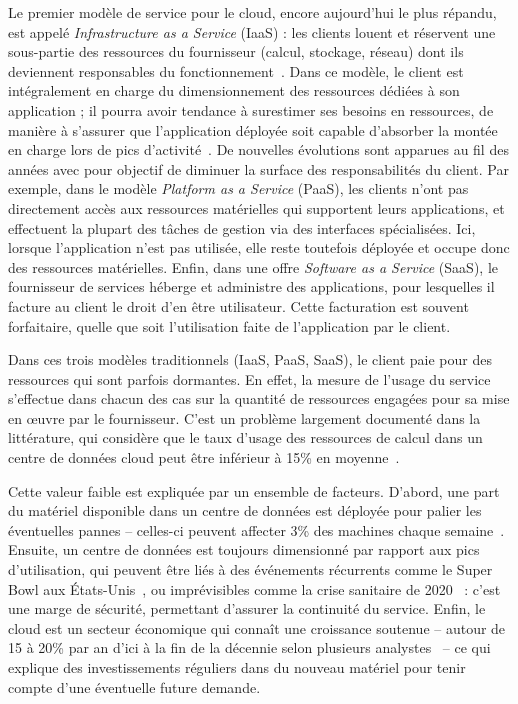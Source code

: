Le premier modèle de service pour le cloud, encore aujourd'hui le plus répandu, est appelé \textit{Infrastructure as a Service} (IaaS) : les clients louent et réservent une sous-partie des ressources du fournisseur (calcul, stockage, réseau) dont ils deviennent responsables du fonctionnement~\cite{mellNISTDefinitionCloud}. Dans ce modèle, le client est intégralement en charge du dimensionnement des ressources dédiées à son application ; il pourra avoir tendance à surestimer ses besoins en ressources, de manière à s'assurer que l'application déployée soit capable d'absorber la montée en charge lors de pics d'activité~\cite{takMoveNotMove}. De nouvelles évolutions sont apparues au fil des années avec pour objectif de diminuer la surface des responsabilités du client. Par exemple, dans le modèle \textit{Platform as a Service} (PaaS), les clients n'ont pas directement accès aux ressources matérielles qui supportent leurs applications, et effectuent la plupart des tâches de gestion via des interfaces spécialisées. Ici, lorsque l'application n'est pas utilisée, elle reste toutefois déployée et occupe donc des ressources matérielles. Enfin, dans une offre \textit{Software as a Service} (SaaS), le fournisseur de services héberge et administre des applications, pour lesquelles il facture au client le droit d'en être utilisateur. Cette facturation est souvent forfaitaire, quelle que soit l'utilisation faite de l'application par le client.

Dans ces trois modèles traditionnels (IaaS, PaaS, SaaS), le client paie pour des ressources qui sont parfois dormantes. En effet, la mesure de l'usage du service s'effectue dans chacun des cas sur la quantité de ressources engagées pour sa mise en œuvre par le fournisseur. C'est un problème largement documenté dans la littérature, qui considère que le taux d'usage des ressources de calcul dans un centre de données cloud peut être inférieur à 15\% en moyenne~\cite{vasanWorthTheirWatts2010, vermaLargescaleClusterManagement2015a}.

Cette valeur faible est expliquée par un ensemble de facteurs. D'abord, une part du matériel disponible dans un centre de données est déployée pour palier les éventuelles pannes -- celles-ci peuvent affecter 3\% des machines chaque semaine~\cite{BareMetal70B}. Ensuite, un centre de données est toujours dimensionné par rapport aux pics d'utilisation, qui peuvent être liés à des événements récurrents comme le Super Bowl aux États-Unis~\cite{wangTouchdownCloudImpact2019}, ou imprévisibles comme la crise sanitaire de 2020~\cite{alashhabImpactCoronavirusPandemic2021} : c'est une marge de sécurité, permettant d'assurer la continuité du service. Enfin, le cloud est un secteur économique qui connaît une croissance soutenue -- autour de 15 à 20\% par an d'ici à la fin de la décennie selon plusieurs analystes~\cite{CloudComputingMarket, WorldwideSpendingPublic} -- ce qui explique des investissements réguliers dans du nouveau matériel pour tenir compte d'une éventuelle future demande.

